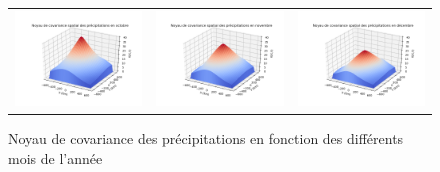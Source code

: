 \documentclass[a4paper,11pt]{article}
\numberwithin{equation}{section}
\begin{document}
\begin{figure}[H]
\begin{tabular}{ccc}
	\includegraphics[scale=0.34]{images/kernel_precip_m10.png} & \includegraphics[scale=0.34]{images/kernel_precip_m11.png} & \includegraphics[scale=0.34]{images/kernel_precip_m12.png} \\
\end{tabular}
	\label{fig-kernel-precip}
	\caption{Noyau de covariance des précipitations en fonction des différents mois de l'année}
\end{figure}
\end{document}
